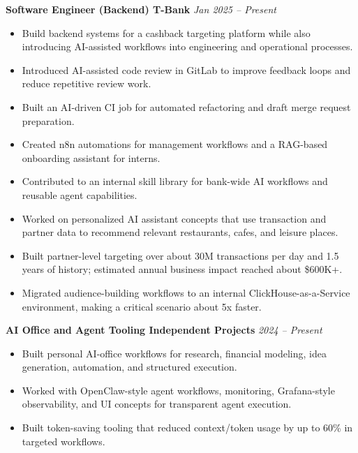 \documentclass[10pt,a4paper]{article}
\begin{document}
\textbf{Software Engineer (Backend) \textbar{} T-Bank} \hfill \textit{Jan 2025 -- Present}
\begin{itemize}
  \item Build backend systems for a cashback targeting platform while also introducing AI-assisted workflows into engineering and operational processes.
  \item Introduced AI-assisted code review in GitLab to improve feedback loops and reduce repetitive review work.
  \item Built an AI-driven CI job for automated refactoring and draft merge request preparation.
  \item Created n8n automations for management workflows and a RAG-based onboarding assistant for interns.
  \item Contributed to an internal skill library for bank-wide AI workflows and reusable agent capabilities.
  \item Worked on personalized AI assistant concepts that use transaction and partner data to recommend relevant restaurants, cafes, and leisure places.
  \item Built partner-level targeting over about 30M transactions per day and 1.5 years of history; estimated annual business impact reached about \$600K+.
  \item Migrated audience-building workflows to an internal ClickHouse-as-a-Service environment, making a critical scenario about 5x faster.
\end{itemize}

\textbf{AI Office and Agent Tooling \textbar{} Independent Projects} \hfill \textit{2024 -- Present}
\begin{itemize}
  \item Built personal AI-office workflows for research, financial modeling, idea generation, automation, and structured execution.
  \item Worked with OpenClaw-style agent workflows, monitoring, Grafana-style observability, and UI concepts for transparent agent execution.
  \item Built token-saving tooling that reduced context/token usage by up to 60\% in targeted workflows.
\end{itemize}
\end{document}
